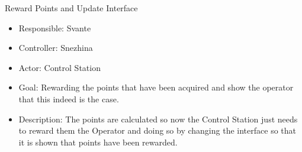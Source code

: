 Reward Points and Update Interface
\begin{itemize}
    \item Responsible: Svante
    \item Controller: Snezhina
    \item Actor: Control Station
    \item Goal: Rewarding the points that have been acquired and show the operator that this indeed is the case. 
    \item Description: The points are calculated so now the Control Station just needs to reward them the Operator and doing so by changing the interface so that it is shown that points have been rewarded.
\end{itemize}